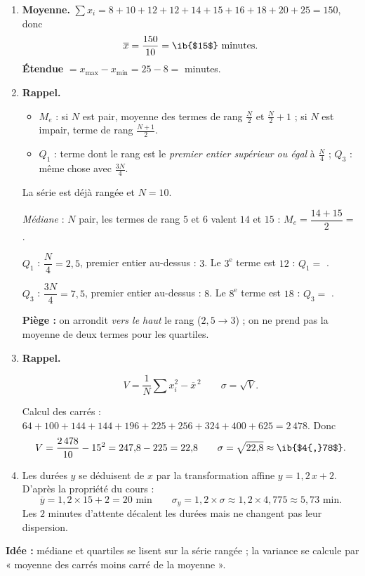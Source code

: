 \begin{enumerate}
  \item \textbf{Moyenne.} $\displaystyle\sum x_i=8+10+12+12+14+15+16+18+20+25=150$, donc
  $$\overline{x}=\frac{150}{10}=\ib{$15$}\text{ minutes.}$$
  \textbf{Étendue} $=x_{\max}-x_{\min}=25-8=$  minutes.
  \item \textbf{Rappel.}\par
  \begin{prop}
  \begin{itemize}
    \item $M_e$ : si $N$ est pair, moyenne des termes de rang $\frac N2$ et $\frac N2+1$ ; si $N$ est impair, terme de rang $\frac{N+1}2$.
    \item $Q_1$ : terme dont le rang est le \emph{premier entier supérieur ou égal} à $\frac N4$ ; $Q_3$ : même chose avec $\frac{3N}4$.
  \end{itemize}
  \end{prop}
  La série est déjà rangée et $N=10$.

  \emph{Médiane} : $N$ pair, les termes de rang $5$ et $6$ valent $14$ et $15$ : $M_e=\dfrac{14+15}2=$ .

  \emph{$Q_1$} : $\dfrac N4=2{,}5$, premier entier au-dessus : $3$. Le $3^{\text{e}}$ terme est $12$ : $Q_1=$ .

  \emph{$Q_3$} : $\dfrac{3N}4=7{,}5$, premier entier au-dessus : $8$. Le $8^{\text{e}}$ terme est $18$ : $Q_3=$ .

  \textbf{Piège :} on arrondit \emph{vers le haut} le rang ($2{,}5\to3$) ; on ne prend pas la moyenne de deux termes pour les quartiles.
  \item \textbf{Rappel.}\par
  \begin{prop}
  $$V=\frac1N\sum x_i^2-\overline{x}^{\,2}\qquad\sigma=\sqrt V .$$
  \end{prop}
  Calcul des carrés : $64+100+144+144+196+225+256+324+400+625=2\,478$. Donc
  $$V=\frac{2\,478}{10}-15^2=247{,}8-225=22{,}8\qquad\sigma=\sqrt{22{,}8}\approx\ib{$4{,}78$}.$$
  \item Les durées $y$ se déduisent de $x$ par la transformation affine $y=1{,}2\,x+2$. D'après la propriété du cours :
  $$\overline{y}=1{,}2\times15+2=20\text{ min}\qquad \sigma_y=1{,}2\times\sigma\approx1{,}2\times4{,}775\approx5{,}73\text{ min}.$$
  Les $2$ minutes d'attente décalent les durées mais ne changent pas leur dispersion.
\end{enumerate}

\textbf{Idée :} médiane et quartiles se lisent sur la série rangée ; la variance se calcule par « moyenne des carrés moins carré de la moyenne ».
